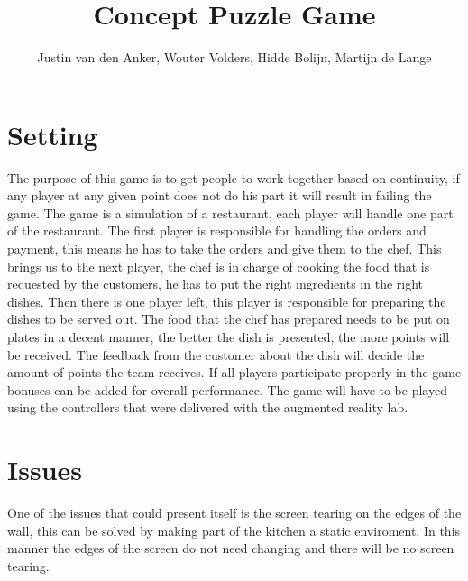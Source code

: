 \documentclass[10pt,a4paper]{article}
\author{Justin van den Anker, Wouter Volders, Hidde Bolijn, Martijn de Lange}
\title{Concept Puzzle Game}
\begin{document}
\section{Setting}
The purpose of this game is to get people to work together based on continuity, if any player at any given point does not do his part it will result in failing the game. The game is a simulation of a restaurant, each player will handle one part of the restaurant. The first player is responsible for handling the orders and payment, this means he has to take the orders and give them to the chef. This brings us to the next player, the chef is in charge of cooking the food that is requested by the customers, he has to put the right ingredients in the right dishes. Then there is one player left, this player is responsible for preparing the dishes to be served out. The food that the chef has prepared needs to be put on plates in a decent manner, the better the dish is presented, the more points will be received. The feedback from the customer about the dish will decide the amount of points the team receives. If all players participate properly in the game bonuses can be added for overall performance. The game will have to be played using the controllers that were delivered with the augmented reality lab. 

\section{Issues}
One of the issues that could present itself is the screen tearing on the edges of the wall, this can be solved by making part of the kitchen a static enviroment. In this manner the edges of the screen do not need changing and there will be no screen tearing.
\end{document}
